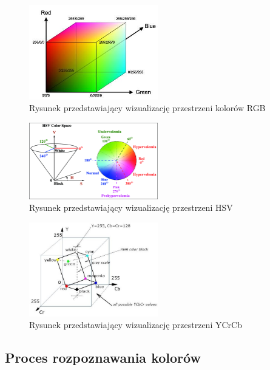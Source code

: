 \begin{figure}[H]
    \centering
    \includegraphics[width=0.5\textwidth]{./graf/rgb-model.png}
    \caption{Rysunek przedstawiający wizualizację przestrzeni kolorów RGB \cite{bib:rgb-model}}
    \label{rys2:rgb1}
\end{figure}

\begin{figure}[H]
    \centering
    \includegraphics[width=0.5\textwidth]{./graf/hsv-model.png}
    \caption{Rysunek przedstawiający wizualizację przestrzeni HSV \cite{bib:hsv-model}}
    \label{rys2:hsv1}
\end{figure}


\begin{figure}[H]
    \centering
    \includegraphics[width=0.5\textwidth]{./graf/ycrcb-model.png}
    \caption{Rysunek przedstawiający wizualizację przestrzeni YCrCb \cite{bib:ycrcb-model}}
    \label{rys2:ycrcb1}
\end{figure}


\subsection{Proces rozpoznawania kolorów}

